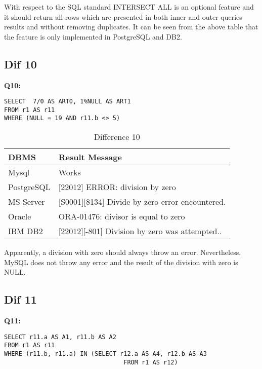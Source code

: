 \hfill\newpage
With respect to the SQL standard INTERSECT ALL is an optional feature and it should return all rows which are presented in both inner and outer queries results and without removing duplicates. It can be seen from the above table that the feature is only implemented in PostgreSQL and DB2.  
 
\subsection{Dif 10}
  
\textbf{Q10:}
\begin{mdframed}[backgroundcolor=lightgray!20]
\begin{lstlisting}[style=SQL]
SELECT  7/0 AS ART0, 1%NULL AS ART1
FROM r1 AS r11
WHERE (NULL = 19 AND r11.b <> 5)   
\end{lstlisting}
\end{mdframed}
  
\begin{table}[h]
\centering
\caption{Difference 10}
\label{my-label}
\begin{tabular}
{|p{2cm}|p{11.5cm}| }
\hline
\textbf{DBMS} & \textbf{Result Message}                                 \\ \hline
Mysql         & Works                                                   \\ \hline
PostgreSQL    & {[}22012{]} ERROR: division by zero                     \\ \hline
MS Server     & {[}S0001{]}{[}8134{]} Divide by zero error encountered. \\ \hline
Oracle        & ORA-01476: divisor is equal to zero                     \\ \hline
IBM DB2       & {[}22012{]}{[}-801{]} Division by zero was attempted..  \\ \hline
\end{tabular}
\end{table}

Apparently, a division with zero should always throw an error. Nevertheless, MySQL does not throw any error and the result of the division with zero is NULL. 

 
\subsection{Dif 11}

\textbf{Q11:}
\begin{mdframed}[backgroundcolor=lightgray!20]
\begin{lstlisting}[style=SQL]
SELECT r11.a AS A1, r11.b AS A2
FROM r1 AS r11
WHERE (r11.b, r11.a) IN (SELECT r12.a AS A4, r12.b AS A3
                         		 FROM r1 AS r12)
\end{lstlisting}
\end{mdframed}

